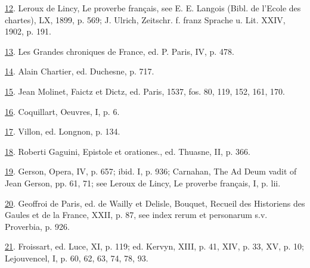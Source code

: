 \protect\hypertarget{23_NOTES.xhtmlux5cux23id_609}{\protect\hyperlink{18_Chapter_Eleven__THE_FORMS_OF_THO.xhtmlux5cux23id_608}{12}}.
Leroux de Lincy, Le proverbe français, see E. E. Langois (Bibl. de
l'Ecole des chartes), LX, 1899, p. 569; J. Ulrich, Zeitschr. f. franz
Sprache u. Lit. XXIV, 1902, p. 191.

\protect\hypertarget{23_NOTES.xhtmlux5cux23id_607}{\protect\hyperlink{18_Chapter_Eleven__THE_FORMS_OF_THO.xhtmlux5cux23id_606}{13}}.
Les Grandes chroniques de France, ed. P. Paris, IV, p. 478.

\protect\hypertarget{23_NOTES.xhtmlux5cux23id_605}{\protect\hyperlink{18_Chapter_Eleven__THE_FORMS_OF_THO.xhtmlux5cux23id_604}{14}}.
Alain Chartier, ed. Duchesne, p. 717.

\protect\hypertarget{23_NOTES.xhtmlux5cux23id_603}{\protect\hyperlink{18_Chapter_Eleven__THE_FORMS_OF_THO.xhtmlux5cux23id_602}{15}}.
Jean Molinet, Faictz et Dictz, ed. Paris, 1537, fos. 80, 119, 152, 161,
170.

\protect\hypertarget{23_NOTES.xhtmlux5cux23id_601}{\protect\hyperlink{18_Chapter_Eleven__THE_FORMS_OF_THO.xhtmlux5cux23id_600}{16}}.
Coquillart, Oeuvres, I, p. 6.

\protect\hypertarget{23_NOTES.xhtmlux5cux23id_599}{\protect\hyperlink{18_Chapter_Eleven__THE_FORMS_OF_THO.xhtmlux5cux23id_598}{17}}.
Villon, ed. Longnon, p. 134.

\protect\hypertarget{23_NOTES.xhtmlux5cux23id_597}{\protect\hyperlink{18_Chapter_Eleven__THE_FORMS_OF_THO.xhtmlux5cux23id_596}{18}}.
Roberti Gaguini, Epistole et orationes., ed. Thuasne, II, p. 366.

\protect\hypertarget{23_NOTES.xhtmlux5cux23id_595}{\protect\hyperlink{18_Chapter_Eleven__THE_FORMS_OF_THO.xhtmlux5cux23id_594}{19}}.
Gerson, Opera, IV, p. 657; ibid. I, p. 936; Carnahan, The Ad Deum vadit
of Jean Gerson, pp. 61, 71; see Leroux de Lincy, Le proverbe français,
I, p. lii.

\protect\hypertarget{23_NOTES.xhtmlux5cux23id_593}{\protect\hyperlink{18_Chapter_Eleven__THE_FORMS_OF_THO.xhtmlux5cux23id_592}{20}}.
Geoffroi de Paris, ed. de Wailly et Delisle, Bouquet, Recueil des
Historiens des Gaules et de la France, XXII, p. 87, see index rerum et
personarum s.v. Proverbia, p. 926.

\protect\hypertarget{23_NOTES.xhtmlux5cux23id_591}{\protect\hyperlink{18_Chapter_Eleven__THE_FORMS_OF_THO.xhtmlux5cux23id_590}{21}}.
Froissart, ed. Luce, XI, p. 119; ed. Kervyn, XIII, p. 41, XIV, p. 33,
XV, p. 10; Lejouvencel, I, p. 60, 62, 63, 74, 78, 93.

